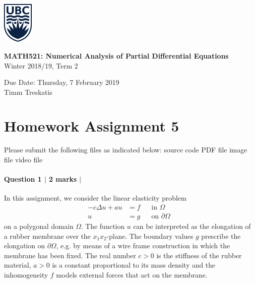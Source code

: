 \documentclass[10pt,letterpaper]{scrartcl}
\begin{document}
\begin{minipage}{.2\textwidth}
\includegraphics[width=42pt]{ubc-logo.png}
\end{minipage}
\hfill
\begin{minipage}{.75\textwidth}
\setlength{\parskip}{6pt}
\begin{flushright}
{
\sffamily
\textbf{MATH521: Numerical Analysis of Partial Differential Equations}\\
Winter 2018/19, Term 2

Due Date: Thursday, 7 February 2019\\
Timm Treskatis
}
\end{flushright}
\end{minipage}

\section*{Homework Assignment 5}

Please submit the following files as indicated below: \hfill \faFileCodeO \: source code \hfill \faFilePdfO \: PDF file \hfill \faFilePictureO \: image file \hfill \faFileMovieO \: video file

\paragraph*{Question 1 $\vert$ 2 marks $\vert$ \faFilePdfO}

In this assignment, we consider the linear elasticity problem
\begin{equation}\label{eq:le}
\begin{aligned}
-c\Delta u + a u &= f &&\text{in } \Omega\\
u &= g && \text{on } \partial\Omega
\end{aligned}
\end{equation}
on a polygonal domain $\Omega$. The function $u$ can be interpreted as the elongation of a rubber membrane over the $x_1x_2$-plane. The boundary values $g$ prescribe the elongation on $\partial\Omega$, e.g. by means of a wire frame construction in which the membrane has been fixed. The real number $c>0$ is the stiffness of the rubber material, $a>0$ is a constant proportional to its mass density and the inhomogeneity $f$ models external forces that act on the membrane.
\end{document}
